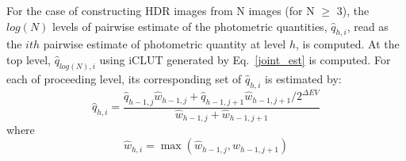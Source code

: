 For the case of constructing HDR images from N images (for N $\ge$ 3), the $log(N)$ levels of 
pairwise estimate of the photometric quantities, $\hat{q}_{h,i}$, read as the $ith$ pairwise estimate of 
photometric quantity at level $h$, is computed. At the top level, $\hat{q}_{log(N),i}$ using iCLUT 
generated by Eq.~\ref{joint_est} is computed. For each of proceeding level, its corresponding set of $
\hat{q}_{h,i}$ is estimated by: 
\begin{equation}
\hat{q}_{h,i}=\frac{\hat{q}_{h-1,j}\hat{w}_{h-1,j}+\hat{q}_{h-1,j+1}\hat{w}_{h-1,j+1}/ 2^{\Delta EV}}
{\hat{w}_{h-1,j}+\hat{w}_{h-1,j+1}}
\end{equation}
where
\begin{equation}
\hat{w}_{h,i}=\max(\hat{w}_{h-1,j},\hat{w}_{h-1,j+1})
\end{equation}






